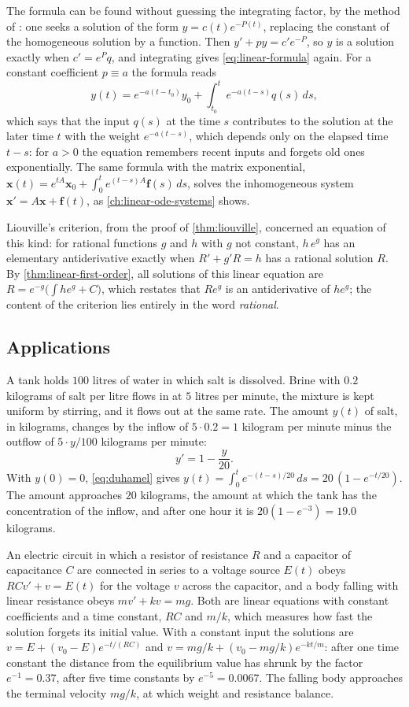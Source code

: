 The formula can be found without guessing the integrating factor, by the method of : one seeks a solution of the form $y=c(t)e^{-P(t)}$, replacing the constant of the homogeneous solution by a function. Then $y'+py=c'e^{-P}$, so $y$ is a solution exactly when $c'=e^Pq$, and integrating gives \eqref{eq:linear-formula} again. For a constant coefficient $p\equiv a$ the formula reads
\begin{equation}
y(t)=e^{-a(t-t_0)}y_0+\int_{t_0}^te^{-a(t-s)}q(s)\,ds ,
\label{eq:duhamel}
\end{equation}
which says that the input $q(s)$ at the time $s$ contributes to the solution at the later time $t$ with the weight $e^{-a(t-s)}$, which depends only on the elapsed time $t-s$: for $a>0$ the equation remembers recent inputs and forgets old ones exponentially. The same formula with the matrix exponential, $\mathbf x(t)=e^{tA}\mathbf x_0+\int_0^te^{(t-s)A}\mathbf f(s)\,ds$, solves the inhomogeneous system $\mathbf x'=A\mathbf x+\mathbf f(t)$, as \cref{ch:linear-ode-systems} shows.

Liouville's criterion, from the proof of \cref{thm:liouville}, concerned an equation of this kind: for rational functions $g$ and $h$ with $g$ not constant, $h\,e^g$ has an elementary antiderivative exactly when $R'+g'R=h$ has a rational solution $R$. By \cref{thm:linear-first-order}, all solutions of this linear equation are $R=e^{-g}\bigl(\int he^g+C\bigr)$, which restates that $Re^g$ is an antiderivative of $he^g$; the content of the criterion lies entirely in the word \emph{rational}.

\subsection{Applications}

A tank holds $100$ litres of water in which salt is dissolved. Brine with $0.2$ kilograms of salt per litre flows in at $5$ litres per minute, the mixture is kept uniform by stirring, and it flows out at the same rate. The amount $y(t)$ of salt, in kilograms, changes by the inflow of $5\cdot0.2=1$ kilogram per minute minus the outflow of $5\cdot y/100$ kilograms per minute:
\[
y'=1-\frac y{20} .
\]
With $y(0)=0$, \eqref{eq:duhamel} gives $y(t)=\int_0^te^{-(t-s)/20}\,ds=20\,(1-e^{-t/20})$. The amount approaches $20$ kilograms, the amount at which the tank has the concentration of the inflow, and after one hour it is $20(1-e^{-3})=19.0$ kilograms.

An electric circuit in which a resistor of resistance $R$ and a capacitor of capacitance $C$ are connected in series to a voltage source $E(t)$ obeys $RCv'+v=E(t)$ for the voltage $v$ across the capacitor, and a body falling with linear resistance obeys $mv'+kv=mg$. Both are linear equations with constant coefficients and a time constant, $RC$ and $m/k$, which measures how fast the solution forgets its initial value. With a constant input the solutions are $v=E+(v_0-E)e^{-t/(RC)}$ and $v=mg/k+(v_0-mg/k)e^{-kt/m}$: after one time constant the distance from the equilibrium value has shrunk by the factor $e^{-1}=0.37$, after five time constants by $e^{-5}=0.0067$. The falling body approaches the terminal velocity $mg/k$, at which weight and resistance balance.

